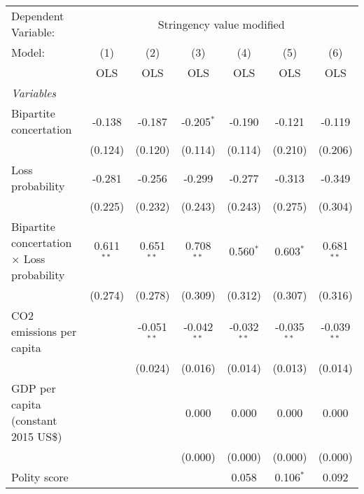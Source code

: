 
\begingroup
\centering
\begin{tabular}{lcccccc}
   \toprule
   Dependent Variable: & \multicolumn{6}{c}{Stringency value modified}\\
   Model:                                            & (1)          & (2)           & (3)           & (4)           & (5)           & (6)\\  
                                                     &  OLS         & OLS           & OLS           & OLS           & OLS           & OLS\\  
   \midrule
   \emph{Variables}\\
   Bipartite concertation                            & -0.138       & -0.187        & -0.205$^{*}$  & -0.190        & -0.121        & -0.119\\   
                                                     & (0.124)      & (0.120)       & (0.114)       & (0.114)       & (0.210)       & (0.206)\\   
   Loss probability                                  & -0.281       & -0.256        & -0.299        & -0.277        & -0.313        & -0.349\\   
                                                     & (0.225)      & (0.232)       & (0.243)       & (0.243)       & (0.275)       & (0.304)\\   
   Bipartite concertation $\times$ Loss probability  & 0.611$^{**}$ & 0.651$^{**}$  & 0.708$^{**}$  & 0.560$^{*}$   & 0.603$^{*}$   & 0.681$^{**}$\\   
                                                     & (0.274)      & (0.278)       & (0.309)       & (0.312)       & (0.307)       & (0.316)\\   
   CO2 emissions per capita                          &              & -0.051$^{**}$ & -0.042$^{**}$ & -0.032$^{**}$ & -0.035$^{**}$ & -0.039$^{**}$\\   
                                                     &              & (0.024)       & (0.016)       & (0.014)       & (0.013)       & (0.014)\\   
   GDP per capita (constant 2015 US\$)               &              &               & 0.000         & 0.000         & 0.000         & 0.000\\   
                                                     &              &               & (0.000)       & (0.000)       & (0.000)       & (0.000)\\   
   Polity score                                      &              &               &               & 0.058         & 0.106$^{*}$   & 0.092\\   

\end{tabular}
